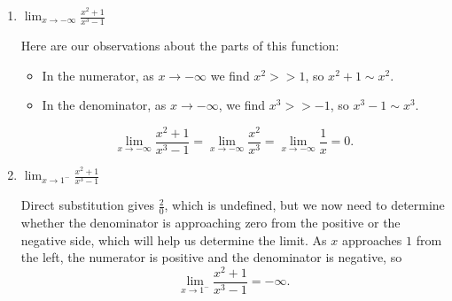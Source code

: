 \documentclass{article}
\begin{document}
\begin{enumerate}
\begin{enumerate}
\begin{enumerate}
      \begin{solution}
        As we've seen, when taking the limit as $x \to \infty$ of a sum, we need to identify the fastest growing term (the highest power of $x$). 
        \begin{itemize}
            \item In the numerator, as $x \to \infty$ we find $x^2>>1$, so $x^2+1 \sim x^2$.
            \item In the denominator, as $x \to \infty$, we find $x^3>>-1$, so $x^3-1 \sim x^3$.
        \end{itemize}
        Taking this into account, we can reason the following:
        \[
          \lim_{x \to \infty} \frac{x^2 + 1}{x^3 - 1} = \lim_{x \to \infty} \frac{x^2}{x^3}
          = \lim_{x \to \infty} \frac{1}{x} = 0.
        \]
      \end{solution}

    \item
      \begin{problem}[\vfill]
        $\displaystyle \lim_{x \to -\infty} \frac{x^2 + 1}{x^3 - 1}$
      \end{problem}

      \begin{solution}
      Here are our observations about the parts of this function:
        \begin{itemize}
            \item In the numerator, as $x \to -\infty$ we find $x^2>>1$, so $x^2+1 \sim x^2$.
            \item In the denominator, as $x \to -\infty$, we find $x^3>>-1$, so $x^3-1 \sim x^3$.
        \end{itemize}
        \[
          \lim_{x \to -\infty} \frac{x^2 + 1}{x^3 - 1} = \lim_{x \to -\infty} \frac{x^2}{x^3}
          = \lim_{x \to -\infty} \frac{1}{x} = 0.
        \]
      \end{solution}

    \item
      \begin{problem}[\vfill]
        $\displaystyle \lim_{x \to 1^-} \frac{x^2 + 1}{x^3 - 1}$
      \end{problem}

      \begin{solution}
        Direct substitution gives $\frac{2}{0}$, which is undefined, but we now need to determine whether the denominator is approaching zero from the positive or the negative side, which will help us determine the limit. As $x$ approaches $1$ from the left, the numerator is positive
        and the denominator is negative, so
        \[\lim_{x \to 1^-} \frac{x^2 + 1}{x^3 - 1}=-\infty.\]
      \end{solution}


\end{enumerate}
\end{enumerate}
\end{enumerate}
\end{document}

